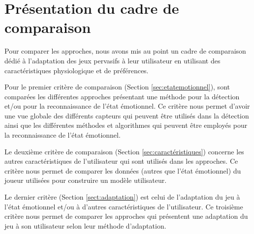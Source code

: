 \documentclass{article}
\begin{document}
\section{Présentation du cadre de comparaison}
\label{sec:choixcadre}
    Pour comparer les approches, nous avons mis au point un cadre de comparaison dédié à l'adaptation des jeux pervasifs à leur utilisateur en utilisant des caractéristiques physiologique et de préférences.\par
    Pour le premier critère de comparaison (Section \ref{sec:etatemotionnel}), sont comparées les différentes approches présentant une méthode pour la détection et/ou pour la reconnaissance de l'état émotionnel. 
    Ce critère nous permet d'avoir une vue globale des différents capteurs qui peuvent être utilisés dans la détection ainsi que les différentes méthodes et algorithmes qui peuvent être employés pour la reconnaissance de l'état émotionnel.\par
    Le deuxième critère de comparaison (Section \ref{sec:caractéristiques}) concerne les autres caractéristiques de l'utilisateur qui sont utilisés dans les approches. Ce critère nous permet de comparer les données (autres que l'état émotionnel)  du joueur utilisées pour construire un modèle utilisateur.\par
    Le dernier critère (Section \ref{sect:adaptation}) est celui de l'adaptation du jeu à l'état émotionnel et/ou à d'autres caractéristiques de l'utilisateur. Ce troisième critère nous permet de comparer les approches qui présentent une adaptation du jeu à son utilisateur selon leur méthode d'adaptation.
\end{document}
